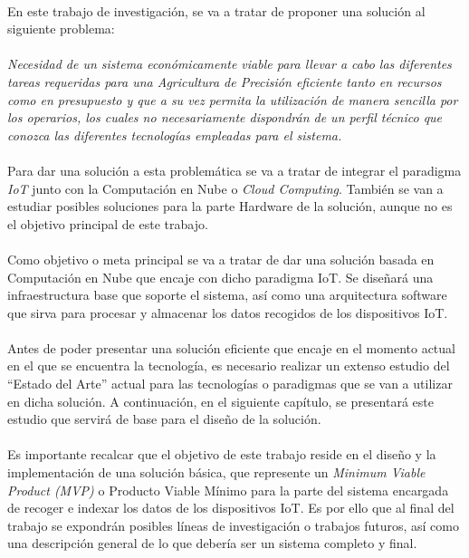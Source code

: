 \documentclass[../../memoria.tex]{subfiles}
\begin{document}
\paragraph{}
En este trabajo de investigación, se va a tratar de proponer una solución al siguiente problema:

\paragraph{}
\textit{
    Necesidad de un sistema económicamente viable para llevar a cabo las diferentes tareas requeridas para una Agricultura de Precisión eficiente tanto en recursos como en presupuesto y que a su vez permita la utilización de manera sencilla por los operarios, los cuales no necesariamente dispondrán de un perfil técnico que conozca las diferentes tecnologías empleadas para el sistema.
}

\paragraph{}
Para dar una solución a esta problemática se va a tratar de integrar el paradigma \textit{\textit{IoT}} junto con la Computación en Nube o \textit{Cloud Computing}. También se van a estudiar posibles soluciones para la parte Hardware de la solución, aunque no es el objetivo principal de este trabajo.

\paragraph{}
Como objetivo o meta principal se va a tratar de dar una solución basada en Computación en Nube que encaje con dicho paradigma IoT. Se diseñará una infraestructura base que soporte el sistema, así como una arquitectura software que sirva para procesar y almacenar los datos recogidos de los dispositivos IoT.

\paragraph{}
Antes de poder presentar una solución eficiente que encaje en el momento actual en el que se encuentra la tecnología, es necesario realizar un extenso estudio del “Estado del Arte” actual para las tecnologías o paradigmas que se van a utilizar en dicha solución. A continuación, en el siguiente capítulo, se presentará este estudio que servirá de base para el diseño de la solución.

\paragraph{}
Es importante recalcar que el objetivo de este trabajo reside en el diseño y la implementación de una solución básica, que represente un \textit{Minimum Viable Product (MVP)} o Producto Viable Mínimo para la parte del sistema encargada de recoger e indexar los datos de los dispositivos IoT. Es por ello que al final del trabajo se expondrán posibles líneas de investigación o trabajos futuros, así como una descripción general de lo que debería ser un sistema completo y final.
\end{document}
